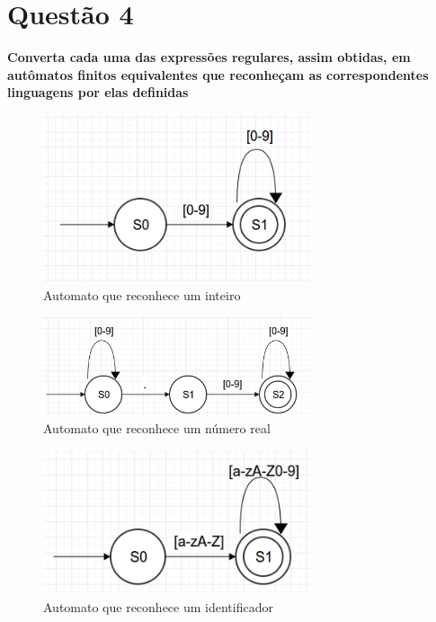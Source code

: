 \documentclass[
	article,			%
	11pt,				%
	oneside,			%
	a4paper,			%
	english,			%
	brazil,				%
	]{abntex2}
\begin{document}
\section{Questão 4}
\textbf{Converta cada uma das expressões regulares, assim obtidas, em autômatos finitos equivalentes que reconheçam as correspondentes linguagens por elas definidas}

\begin{figure}[H]
  \caption{Automato que reconhece um inteiro}
  \centering
    \includegraphics[width=0.7\textwidth]{automatos/integer}
\end{figure}

\begin{figure}[H]
  \caption{Automato que reconhece um número real}
  \centering
    \includegraphics[width=0.7\textwidth]{automatos/float}
\end{figure}

\begin{figure}[H]
  \caption{Automato que reconhece um identificador}
  \centering
    \includegraphics[width=0.7\textwidth]{automatos/keyword_identifier}
\end{figure}
\end{document}
